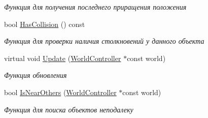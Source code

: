 \begin{DoxyCompactItemize}
\begin{DoxyCompactList}\small\item\em Функция для получения последнего приращения положения \end{DoxyCompactList}\item 
bool \hyperlink{classrtm_1_1_dynamic_object_a0bc9390b78faf5c770bff86a2e451ec6}{Has\+Collision} () const
\begin{DoxyCompactList}\small\item\em Функция для проверки наличия столкновений у данного объекта \end{DoxyCompactList}\item 
virtual void \hyperlink{classrtm_1_1_dynamic_object_a2b2a4072f80d6be9c8d1097bc072197e}{Update} (\hyperlink{classrtm_1_1_world_controller}{World\+Controller} $\ast$const world)
\begin{DoxyCompactList}\small\item\em Функция обновления \end{DoxyCompactList}\item 
bool \hyperlink{classrtm_1_1_dynamic_object_adcbb0baaad8ba2185e00221cc90fdee9}{Is\+Near\+Others} (\hyperlink{classrtm_1_1_world_controller}{World\+Controller} $\ast$const world)
\begin{DoxyCompactList}\small\item\em Функция для поиска объектов неподалеку \end{DoxyCompactList}\end{DoxyCompactItemize}
